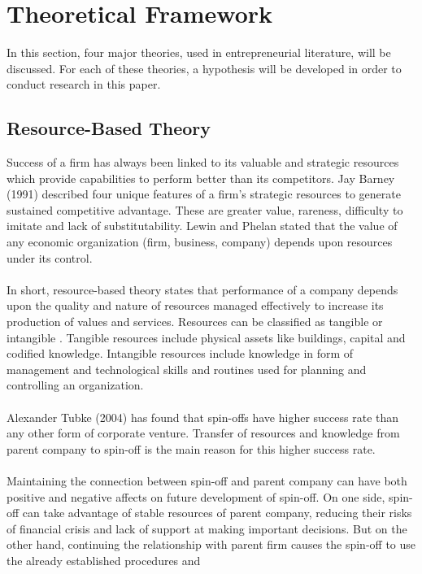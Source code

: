 \chapter{Theoretical Framework\label{cha:chapter3}}
In this section, four major theories, used in entrepreneurial literature, will be discussed. For each of
these theories, a hypothesis will be developed in order to conduct research in this paper.

\section{Resource-Based Theory\label{sec:resource-based-theory}}
Success of a firm has always been linked to its valuable and strategic resources which provide 
capabilities to perform better than its competitors. Jay Barney (1991) \cite{32}  described four
unique features of a firm’s strategic resources to generate sustained competitive
advantage. These are greater value, rareness, difficulty to imitate and lack of substitutability.
Lewin and Phelan \cite{33} stated that the value of any economic organization (firm, business, company)
depends upon resources under its control. 
\\
\\
In short, resource-based theory states that performance of a company depends
upon the quality and nature of resources managed effectively to increase its production of values
and services. Resources can be classified as tangible or intangible . Tangible resources include physical assets
like buildings, capital and codified knowledge. Intangible resources include knowledge in form of
management and technological skills and routines used for planning and controlling an
organization.
\\
\\
Alexander Tubke (2004) \cite{34} has found that spin-offs have higher success rate than any other form
of corporate venture. Transfer of resources and knowledge from parent company to spin-off is the
main reason for this higher success rate. 
\\
\\
Maintaining the connection between spin-off and parent
company can have both positive and negative affects on future development of spin-off. On one
side, spin-off can take advantage of stable resources of parent company, reducing their risks of
financial crisis and lack of support at making important decisions. But on the other hand, continuing
the relationship with parent firm causes the spin-off to use the already established procedures and

